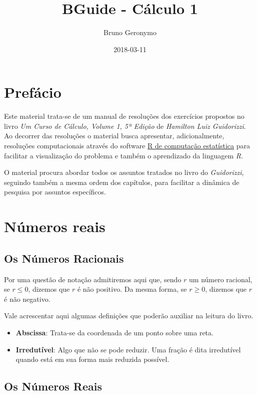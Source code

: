 \documentclass[]{book}
\title{BGuide - Cálculo 1}
\author{Bruno Geronymo}
\date{2018-03-11}
\providecommand{\tightlist}{%
  \setlength{\itemsep}{0pt}\setlength{\parskip}{0pt}}
\begin{document}
\maketitle

{
\setcounter{tocdepth}{1}
\tableofcontents
}
\chapter*{Prefácio}\label{prefacio}

Este material trata-se de um manual de resoluções dos exercícios
propostos no livro \emph{Um Curso de Cálculo, Volume 1, 5ª Edição} de
\emph{Hamilton Luiz Guidorizzi}. Ao decorrer das resoluções o material
busca apresentar, adicionalmente, resoluções computacionais através do
software \href{https://www.r-project.org/}{R de computação estatística}
para facilitar a visualização do problema e também o aprendizado da
linguagem \emph{R}.

O material procura abordar todos os assuntos tratados no livro do
\emph{Guidorizzi}, seguindo também a mesma ordem dos capítulos, para
facilitar a dinâmica de pesquisa por assuntos específicos.

\chapter{Números reais}\label{numeros-reais}

\section{Os Números Racionais}\label{os-numeros-racionais}

Por uma questão de notação admitiremos aqui que, sendo \(r\) um número
racional, se \(r \leqslant 0\), dizemos que \(r\) é não positivo. Da
mesma forma, se \(r \geqslant 0\), dizemos que \(r\) é não negativo.

Vale acrescentar aqui algumas definições que poderão auxiliar na leitura
do livro.

\begin{itemize}
\tightlist
\item
  \textbf{Abscissa}: Trata-se da coordenada de um ponto sobre uma reta.
\item
  \textbf{Irredutível}: Algo que não se pode reduzir. Uma fração é dita
  irredutível quando está em sua forma mais reduzida possível.
\end{itemize}

\section{Os Números Reais}\label{os-numeros-reais}
\end{document}
